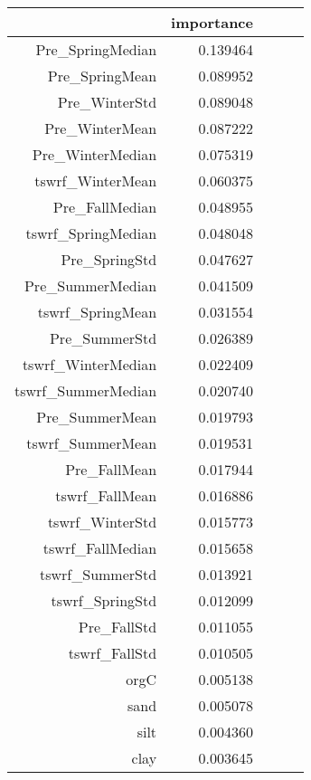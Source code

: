 \begin{tabular}{rrrrr}
\toprule
 & importance \\
\midrule
Pre_SpringMedian & 0.139464 \\
Pre_SpringMean & 0.089952 \\
Pre_WinterStd & 0.089048 \\
Pre_WinterMean & 0.087222 \\
Pre_WinterMedian & 0.075319 \\
tswrf_WinterMean & 0.060375 \\
Pre_FallMedian & 0.048955 \\
tswrf_SpringMedian & 0.048048 \\
Pre_SpringStd & 0.047627 \\
Pre_SummerMedian & 0.041509 \\
tswrf_SpringMean & 0.031554 \\
Pre_SummerStd & 0.026389 \\
tswrf_WinterMedian & 0.022409 \\
tswrf_SummerMedian & 0.020740 \\
Pre_SummerMean & 0.019793 \\
tswrf_SummerMean & 0.019531 \\
Pre_FallMean & 0.017944 \\
tswrf_FallMean & 0.016886 \\
tswrf_WinterStd & 0.015773 \\
tswrf_FallMedian & 0.015658 \\
tswrf_SummerStd & 0.013921 \\
tswrf_SpringStd & 0.012099 \\
Pre_FallStd & 0.011055 \\
tswrf_FallStd & 0.010505 \\
orgC & 0.005138 \\
sand & 0.005078 \\
silt & 0.004360 \\
clay & 0.003645 \\
\bottomrule
\end{tabular}
